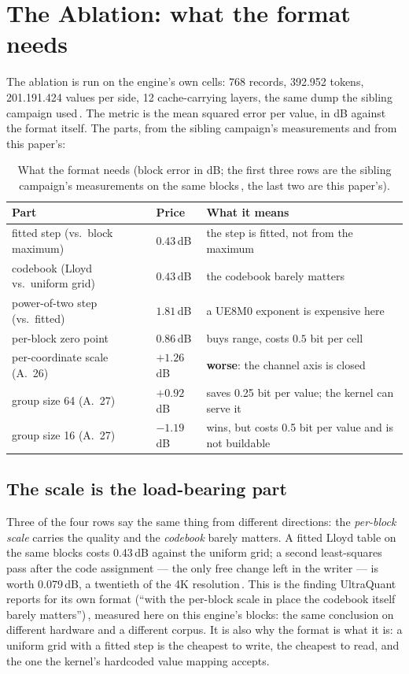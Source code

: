 \documentclass[10pt,twocolumn]{article}
\begin{document}
\section{The Ablation: what the format needs}
\label{sec:ablation}

The ablation is run on the engine's own cells: 768 records, 392.952 tokens, 201.191.424 values per side,
12 cache-carrying layers, the same dump the sibling campaign used\,\cite{shear}. The metric is the mean
squared error per value, in dB against the format itself. The parts, from the sibling campaign's
measurements and from this paper's:

\begin{table}[t]
\centering
\caption{What the format needs (block error in dB; the first three rows are the sibling campaign's
measurements on the same blocks\,\cite{shear}, the last two are this paper's).}
\label{tab:ablation}
\begin{tabularx}{\linewidth}{@{}lXX@{}}
\toprule
Part & Price & What it means \\
\midrule
fitted step (vs.\ block maximum) & $0.43$\,dB & the step is fitted, not from the maximum \\
codebook (Lloyd vs.\ uniform grid) & $0.43$\,dB & the codebook barely matters \\
power-of-two step (vs.\ fitted) & $1.81$\,dB & a UE8M0 exponent is expensive here \\
per-block zero point & $0.86$\,dB & buys range, costs $0.5$ bit per cell \\
per-coordinate scale (A.~26) & $+1.26$\,dB & \textbf{worse}: the channel axis is closed \\
group size 64 (A.~27) & $+0.92$\,dB & saves 0.25 bit per value; the kernel can serve it \\
group size 16 (A.~27) & $-1.19$\,dB & wins, but costs 0.5 bit per value and is not buildable \\
\bottomrule
\end{tabularx}
\end{table}

\subsection{The scale is the load-bearing part}

Three of the four rows say the same thing from different directions: the \emph{per-block scale} carries the
quality and the \emph{codebook} barely matters. A fitted Lloyd table on the same blocks costs 0.43\,dB
against the uniform grid; a second least-squares pass after the code assignment --- the only free change
left in the writer --- is worth 0.079\,dB, a twentieth of the 4K resolution\,\cite{shear}. This is the
finding UltraQuant reports for its own format (``with the per-block scale in place the codebook itself
barely matters'')\,\cite{ultraquant}, measured here on this engine's blocks: the same conclusion on
different hardware and a different corpus. It is also why the format is what it is: a uniform grid with a
fitted step is the cheapest to write, the cheapest to read, and the one the kernel's hardcoded value
mapping accepts.
\end{document}
